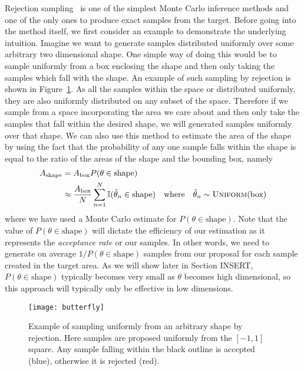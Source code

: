 Rejection sampling~\citep{robert2004monte} is one of the simplest Monte Carlo 
inference methods and one of the only ones to produce exact samples from 
the target.  Before going into the method itself, we first consider an example to
demonstrate the underlying intuition.  Imagine we want to generate samples 
distributed uniformly over some arbitrary two dimensional shape.  One simple
way of doing this would be to sample uniformly from a box enclosing the
shape and then only taking the samples which fall with the shape.
An example of such sampling by rejection is shown in Figure~\ref{fig:inf:rej-butt}.
As all the samples within the space or distributed uniformly, they are also
uniformly distributed on any subset of the space.  Therefore if we sample
from a space incorporating the area we care about and then only take the samples
that fall within the desired shape, we will generated samples uniformly over
that shape. We can also use this method to estimate the area of the shape by using
the fact that the probability of any one sample falls within the shape is equal to
the ratio of the areas of the shape and the bounding box, namely
\begin{align}
A_{\text{shape}} &= A_{\text{box}}	P(\theta \in \text{shape}) \\
&\approx \frac{A_{\mathrm{box}}}{N} \sum_{n=1}^{N} \mathbb{I} (\hat{\theta}_n \in \text{shape})
\quad \text{where} \quad \hat{\theta}_n \sim \textsc{Uniform}(\text{box})
\end{align}
where we have used a Monte Carlo estimate for $P(\theta \in \text{shape})$.
Note that the value of $P(\theta \in \text{shape})$ will
dictate the efficiency of our estimation as it represents the \emph{acceptance rate}
or our samples.  In other words, we need to generate on average $1/P(\theta \in \text{shape})$
samples from our proposal for each sample created in the target area.  As we
will show later in Section INSERT, $P(\theta \in \text{shape})$ typically becomes very
small as $\theta$ becomes high dimensional, so this approach will typically only
be effective in low dimensions.

\begin{figure}[t]
	\centering
	\texttt{[image: butterfly]}
	\caption{Example of sampling uniformly from an arbitrary shape by 
		rejection.  Here samples are proposed uniformly from the $[-1,1]$
		square.  Any sample falling within the black outline is accepted 
		(blue), otherwise it is rejected (red).  \label{fig:inf:rej-butt}}
\end{figure}

